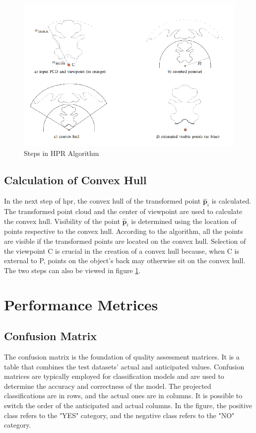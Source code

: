 \begin{figure}[htb]
    \centering
    \includegraphics[width=0.8\linewidth]{97_graphics/related_work/hpr_2.pdf}
    \caption{Steps in HPR Algorithm \parencite{mehra_visibility_XXXX}}
    \label{fig:realted_work-hpr}
\end{figure}

\subsection{Calculation of Convex Hull}
In the next step of \acrshort{hpr}, the convex hull of the transformed point \(\hat{\mathbf{p}}_i \) is calculated. The transformed point cloud and the center of viewpoint are used to calculate the convex hull. Visibility of the point \(\hat{\mathbf{p}}_i \) is determined using the location of points respective to the convex hull. According to the algorithm, all the points are visible if the transformed points are located on the convex hull. Selection of the viewpoint C is crucial in the creation of a convex hull because, when C is external to P, points on the object's back may otherwise sit on the convex hull. The two steps can also be viewed in figure \ref{fig:realted_work-hpr}.

\section{Performance Metrices}
\subsection{Confusion Matrix}
The confusion matrix is the foundation of quality assessment matrices. It is a table that combines the test datasets' actual and anticipated values. Confusion matrices are typically employed for classification models and are used to determine the accuracy and correctness of the model. The projected classifications are in rows, and the actual ones are in columns. It is possible to switch the order of the anticipated and actual columns. In the figure, the positive class refers to the "YES" category, and the negative class refers to the "NO" category.

